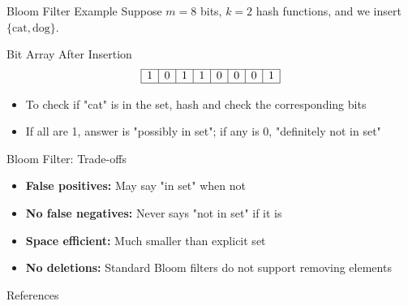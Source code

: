 \documentclass[aspectratio=169]{beamer}
\begin{document}
\begin{frame}{Bloom Filter Example}
  Suppose $m=8$ bits, $k=2$ hash functions, and we insert $\{\text{cat}, \text{dog}\}$.

  \begin{block}{Bit Array After Insertion}
    \[
      \begin{array}{|c|c|c|c|c|c|c|c|}
        \hline
        1 & 0 & 1 & 1 & 0 & 0 & 0 & 1 \\
        \hline
      \end{array}
    \]
  \end{block}

  \begin{itemize}
    \item To check if "cat" is in the set, hash and check the corresponding bits
    \item If all are 1, answer is "possibly in set"; if any is 0, "definitely not in set"
  \end{itemize}
\end{frame}

\begin{frame}{Bloom Filter: Trade-offs}
  \begin{itemize}
    \item \textbf{False positives:} May say "in set" when not

    \item \textbf{No false negatives:} Never says "not in set" if it is

    \item \textbf{Space efficient:} Much smaller than explicit set

    \item \textbf{No deletions:} Standard Bloom filters do not support removing elements
  \end{itemize}
\end{frame}

\begin{frame}[allowframebreaks]{References}
  \printbibliography
\end{frame}
\end{document}
